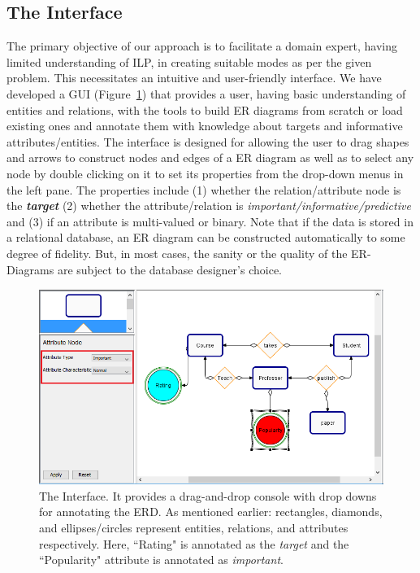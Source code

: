 \documentclass[sigconf]{acmart}
\begin{document}
\subsection{The Interface}
The primary objective of our approach is to facilitate a domain expert, having limited understanding of ILP, in creating suitable modes as per the given problem. This necessitates an intuitive and user-friendly interface. We have developed a GUI (Figure~\ref{fig:interface}) that provides a user, having basic understanding of entities and relations, with the tools to build ER diagrams from scratch or load existing ones and annotate them with knowledge about targets and informative attributes/entities. The interface is designed for allowing the user to drag shapes and arrows to construct nodes and edges of a ER diagram as well as to select any node by double clicking on it to set its properties from the drop-down menus in the left pane. The properties include (1) whether the relation/attribute node is the \textit{\textbf{target}} (2) whether the attribute/relation is \textit{important/informative/predictive} and (3) if an attribute is multi-valued or binary.  Note that if the data is stored in a relational database, an ER diagram can be constructed automatically to some degree of fidelity. But, in most cases, the sanity or the quality of the ER-Diagrams are subject to the database designer's choice. 

\begin{figure}[ht]
    \centering
    \includegraphics[width=\columnwidth]{images/GUI.png}
    \caption{The Interface. It provides a drag-and-drop console with drop downs for annotating the ERD. As mentioned earlier: rectangles, diamonds, and ellipses/circles represent entities, relations, and attributes respectively. Here, ``Rating" is annotated as the \textit{target} and the ``Popularity" attribute is annotated as \textit{important}.}
    \label{fig:interface}
\end{figure}
\end{document}
